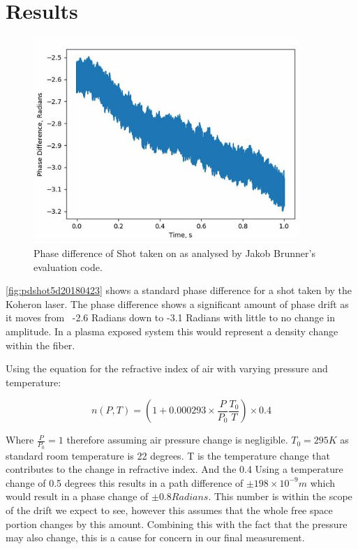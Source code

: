\documentclass[12pt,a4paper,oneside]{report}
\begin{document}
\section{Results}

\begin{figure}[H] 
\includegraphics[width=0.9\textwidth, center,angle=0]{DImages/PD-shot-5-date-20180423.JPG}
\caption{Phase difference of Shot taken on as analysed by Jakob Brunner's evaluation code.}
\label{fig:pdshot5d20180423}
\end{figure}
\autoref{fig:pdshot5d20180423} shows a standard phase difference for a shot taken by the Koheron laser. The phase difference shows a significant amount of phase drift as it moves from ~-2.6 Radians down to -3.1 Radians with little to no change in amplitude. In a plasma exposed system this would represent a density change within the fiber.

Using the equation for the refractive index of air with varying pressure and temperature:

\begin{equation}
n(P, T) = (1 + 0.000293 \times \frac{P}{P_{0}} \frac{T_{0}}{T})\times 0.4
\label{eq:refractive-temp}
\end{equation}

Where $\frac{P}{P_0} = 1$ therefore assuming air pressure change is negligible. $T_0 = 295K$ as standard room temperature is 22 degrees. T is the temperature change that contributes to the change in refractive index. And the 0.4 Using a temperature change of 0.5 degrees \cite{Melikov1997AirRooms} this results in a path difference of $\pm 198\times 10^{-9}m$ which would result in a phase change of $\pm 0.8 Radians$. This number is within the scope of the drift we expect to see, however this assumes that the whole free space portion changes by this amount. Combining this with the fact that the pressure may also change, this is a cause for concern in our final measurement.
\end{document}
